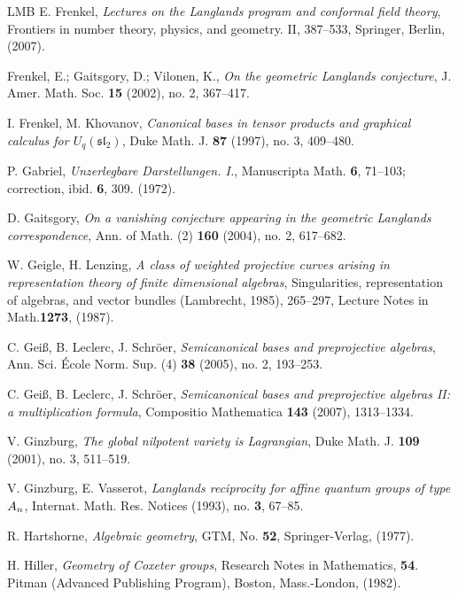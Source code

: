 \documentclass[a4paper,10pt]{amsart}
\numberwithin{equation}{section}
\begin{document}
{\begin{thebibliography}{LMB}
E. Frenkel, \emph{Lectures on the Langlands program and conformal field theory},  Frontiers in number theory, physics, and geometry. II,  387--533, Springer, Berlin, (2007). 

Frenkel, E.; Gaitsgory, D.; Vilonen, K., \emph{On the geometric Langlands conjecture},  J. Amer. Math. Soc. \textbf{15}  (2002),  no. 2, 367--417. 

I. Frenkel, M. Khovanov, \emph{Canonical bases in tensor products and graphical calculus for $U_q(\mathfrak{sl}_2)$},  Duke Math. J. \textbf{87}  (1997),  no. 3, 409--480. 

P. Gabriel, \emph{Unzerlegbare Darstellungen. I.},
Manuscripta Math. \textbf{6}, 71--103; correction, ibid. \textbf{6}, 309. (1972).

D. Gaitsgory, \emph{On a vanishing conjecture appearing in the geometric Langlands correspondence},  Ann. of Math. (2) \textbf{160}  (2004),  no. 2, 617--682.

W. Geigle, H. Lenzing, \emph{A class of weighted projective curves arising in representation theory of finite dimensional algebras}, Singularities, representation of algebras, and vector bundles (Lambrecht, 1985), 265--297, Lecture Notes in Math.\textbf{1273}, (1987). 

C. Gei\ss, B. Leclerc, J. Schr\"oer, \textit{Semicanonical bases and preprojective algebras}, Ann. Sci. \'Ecole
Norm. Sup. (4) \textbf{38} (2005), no. 2, 193--253.

C. Gei\ss, B. Leclerc, J. Schr\"oer, \textit{Semicanonical bases and preprojective algebras II: a multiplication formula}, Compositio Mathematica \textbf{143} (2007), 1313--1334.

V. Ginzburg, \emph{The global nilpotent variety is Lagrangian}, Duke Math. J. \textbf{109}  (2001),  no. 3, 511--519. 

V. Ginzburg, E. Vasserot, \emph{Langlands reciprocity for affine quantum groups of type $A\sb n$},
Internat. Math. Res. Notices (1993), no. \textbf{3}, 67--85. 

R. Hartshorne, \emph{Algebraic geometry},
GTM, No. \textbf{52}, Springer-Verlag, (1977). 

H. Hiller, \emph{Geometry of Coxeter groups}, 
Research Notes in Mathematics, \textbf{54}. Pitman (Advanced Publishing Program), Boston, Mass.-London, (1982).  


\end{thebibliography}}
\end{document}
